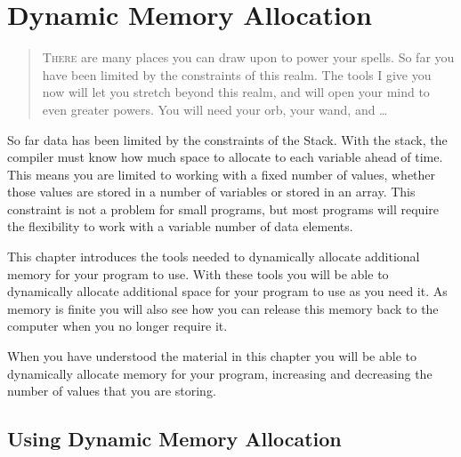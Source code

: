 
\chapter{Dynamic Memory Allocation} %
\label{cha:dynamic_memory_allocation}

\begin{quote}
  \Fontlukas\Large
  \renewcommand{\LettrineTextFont}{\relax}
  \lettrine[image=true,lines=3,lraise=0.1]
  {T}{here} are many places you can draw upon to power your spells. So far you have been limited by the constraints of this realm. The tools I give you now will let you stretch beyond this realm, and will open your mind to even greater powers. You will need your orb, your wand, and \ldots
\end{quote}

\bigskip

So far data has been limited by the constraints of the Stack. With the stack, the compiler must know how much space to allocate to each variable ahead of time. This means you are limited to working with a fixed number of values, whether those values are stored in a number of variables or stored in an array. This constraint is not a problem for small programs, but most programs will require the flexibility to work with a variable number of data elements.

This chapter introduces the tools needed to dynamically allocate additional memory for your program to use. With these tools you will be able to dynamically allocate additional space for your program to use as you need it. As memory is finite you will also see how you can release this memory back to the computer when you no longer require it.

When you have understood the material in this chapter you will be able to dynamically allocate memory for your program, increasing and decreasing the number of values that you are storing.

\minitoc




\clearpage
\section{Using Dynamic Memory Allocation} %
\label{sec:using_dynamic_memory_allocation}

